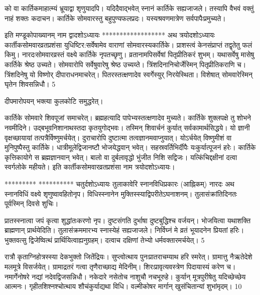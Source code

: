 को वा कार्तिकमाहात्म्यं भ्रूयाद्वा शृणुयादपि।
 यदिदैवाद्भवेत् स्नानं कार्तिके सह्यजाजले।
 तस्यापि वैभवं वक्तुं नाहं शक्तः कदाचन।
 कार्तिके सोमवारस्तु बहुपुण्यफलप्रदः।
 यस्यश्रवणमात्रेण सर्वपापैःप्रमुच्यते।
 
इति मण्डूकोपाख्यानम् नाम द्वादशोऽध्यायः
******************
अथ त्रयोदशोऽध्यायः
कार्तीकसोमवारव्रतप्रशंसा युधिष्टिर:सर्वेषामेव वाराणां सोमवारस्यकार्तिके।
 प्राशस्त्वं केनसंप्राप्तं तद्वृतेतु फलं किमु।
 नारदःसोमवारव्रस्तं वक्ष्ये कार्तिके नृपतच्छृणु।
 व्रतानामपिसर्वेषां पितृप्रीतिकरं शुभम्।
 यथासर्वेषु मासेषु कार्तिके श्रेष्ठ उच्यते।
 सोमवारोपि सर्वेषुवारेषु श्रेष्ठ उच्यय्ते।
 त्रिंशदिनानिचोर्जेस्मिन् पितृप्रीतिकराणि च।
 त्रिंशदिनेषु यो विष्णोर् दीपाराधनमाचरेत्।
 पितरस्तत्क्षणादेव स्वर्गेस्युर् निरयेस्थिता।
 विशेषात् सोमवारेस्मिन् घृतेन शिवसन्निधौ।
 5

  दीपमारोपयन् भक्त्या कुलकोटि समुद्धरेत्।
 
कार्तिके सोमवारे शिवपूजां समाचरेत्।
 ब्रह्महत्यादि पापेभ्यस्तत्क्षणादेव मुच्यते।
 कार्तिके शुक्लपक्षे तु शोभने नवमीदिने।
 उद्बभूवनिशानाथस्तदा कृतयुगोद्भवः।
 तस्मिन् शिवार्चनं कुर्यात् सर्वकामार्थसिद्धये।
 यो ज्ञानी वृक्षच्छायायां तत्पत्रैर्विष्णुमर्चयेत्।
 दुराचारोपि दुष्टात्मा तत्वज्ञानमवाप्नुयात्।
 योऽर्चयेत् विष्णुमीशं वा मुनिपुष्पैस्तु कार्तिके।
 धात्रीमूलेद्विजानष्टौ भोजयेद्धवान् भवेत्।
 सहस्रवर्तिभिर्दीपैः यःकुर्यात्पूजनं हरेः।
 कार्तिके कृत्तिकायोगे स ब्रह्मज्ञानवान् भवेत्।
 बालो वा दुर्बलावृद्धो भुंजीत निशि सद्विजः।
 यत्किंचिद्दक्षीनां दत्वा स्वर्गलोके महीयते।
 इति कार्तीकसोमवारव्रतप्रशंसा नाम
त्रयोदशोऽध्यायः।

*********
**********
चतुर्दशोऽध्यायः तुलाकावेरि स्नानविधिप्रकारः (आह्निकम्)
नारदः
अथ स्नानविधिं वक्ष्ये शृणुष्वावहितोनृप।
 विधिस्स्नानेन मुक्तिस्स्याद्विपरीतेऽघनाशनम्।
 तुलासंक्रांतिदिनतः पूर्वस्मिन् दिवसे शुचिः।
 
प्रातस्स्नात्वा जपं कृत्वा शुद्धांतःकरणो नृप।
 दुष्टसंगति दुर्भाषा दुष्टबुद्धिश्च वर्जयन्।
 भोजयित्वा यथाशक्ति ब्राह्मणान् प्रार्थयेदिति।
 तुलासंक्रममारभ्य स्नास्येहं सह्यजाजले।
 निर्विघ्नं मे व्रतं भूयादनेन प्रियतां हरिः।
 भुक्तवत्सु द्विजेष्वित्थं प्रार्थियित्वाह्यनुग्रहम्।
 दत्वाच दक्षिणां तेभ्यो धर्मवक्तारमर्चयेत्।
 5

  रात्रौ कृताग्निहोत्रस्स्या देकभुक्तो जितेंद्रियः।
 सुप्त्वोत्थाय पुनःप्रातराचम्याथ हरि स्मरेत्।
 ग्रामात्तु नैऋतेदेशे मलमूत्रे विसर्जयेत्।
 ग्रामाद्रतरं गत्वा तृणैराच्छाद्य मेदिनीम्।
 शिरःप्रावृत्यवस्त्रेण पिदायास्यं करेण च।
 नमार्गेनोषरे नद्यां नदेवद्विजसन्निधौ।
 नकेदारे नसेतोच नाशुचौ नचभूरुहे।
 कुर्यान् मूत्रपुरीषेतु यदिच्छेच्छेय आत्मनः।
 गृहीतशिश्नश्चोत्थाय शौचंकुर्याद्यथा विधि।
 वल्मीकोषर मार्गान् खुसंचितान्यां शुभांमृदम्।
 10

